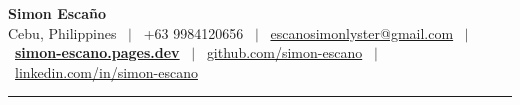 \documentclass[10pt,letterpaper]{article}
\begin{document}
\begin{center}
  {\LARGE \textbf{Simon Esca\~no}} \\[3pt]
  \small
  Cebu, Philippines \ $|$ \ 
  +63 9984120656 \ $|$ \ 
  \href{mailto:escanosimonlyster@gmail.com}{escanosimonlyster@gmail.com} \ $|$ \ 
  \href{https://simon-escano.pages.dev}{\textbf{simon-escano.pages.dev}} \ $|$ \ 
  \href{https://github.com/simon-escano}{github.com/simon-escano} \ $|$ \ 
  \href{https://www.linkedin.com/in/simon-escano/}{linkedin.com/in/simon-escano}
\end{center}
\vspace{-4pt}
\hrule
\vspace{10pt}

\end{document}
